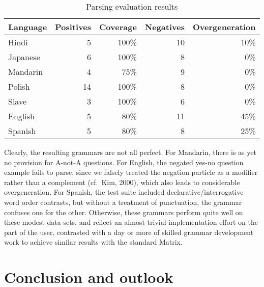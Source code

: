\documentclass[11pt]{article}
\begin{document}
\begin{table*}[ht]
\begin{center}
\small
\begin{tabular}{lrrrr}
\hline
Language & Positives & Coverage & Negatives & Overgeneration \\ \hline
Hindi    & 5         & 100\% 	& 10 & 10\% \\
Japanese & 6         & 100\%    &  8 & 0\% \\
Mandarin & 4	     &  75\%	&  9 & 0\% \\
Polish   & 14	     & 100\%    &  8 & 0\% \\
Slave    & 3         & 100\%	&  6 & 0\% \\
English  & 5	     & 80\%	& 11 & 45\%\\
Spanish  & 5         & 80\%	& 8  & 25\% \\ \hline
\end{tabular}
\end{center}
\caption{Parsing evaluation results}
\label{testresults}
\end{table*}

Clearly, the resulting grammars are not all perfect.  For Mandarin,
there is as yet no provision for A-not-A questions.  For
English, the negated yes-no question example fails to
parse, since we falsely treated the negation particle as a modifier
rather than a complement (cf.\ Kim, 2000\nocite{Kim00}),
which also leads to considerable overgeneration. For Spanish, the
test suite included declarative/interrogative word order contrasts, but
without a treatment of punctuation, the grammar confuses one for the other.
Otherwise, these grammars perform quite well on these modest data sets,
and reflect an almost trivial implementation effort on the part of the user,
contrasted with a day or more of skilled grammar development work to 
achieve similar results with the standard Matrix.

\section{Conclusion and outlook}
\end{document}

